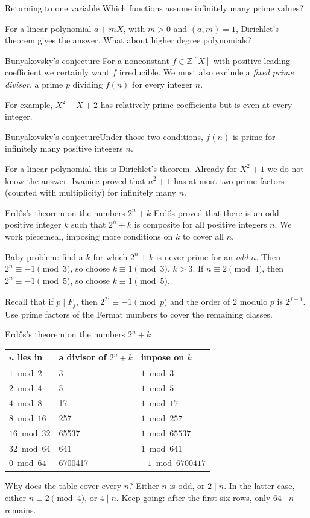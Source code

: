 \documentclass[aspectratio=169,11pt]{beamer}
\newcommand{\Z}{\mathbb Z}
\begin{document}
\begin{frame}{Returning to one variable}
Which functions assume infinitely many prime values?

For a linear polynomial $a+mX$, with $m>0$ and $(a,m)=1$, Dirichlet's theorem gives the answer. What about higher degree polynomials?
\end{frame}
\begin{frame}{Bunyakovsky's conjecture}
For a nonconstant $f\in\Z[X]$ with positive leading coefficient we certainly want $f$ irreducible. We must also exclude a \emph{fixed prime divisor}, a prime $p$ dividing $f(n)$ for every integer $n$.

For example, $X^2+X+2$ has relatively prime coefficients but is even at every integer.
\begin{block}{Bunyakovsky's conjecture}Under those two conditions, $f(n)$ is prime for infinitely many positive integers $n$.\end{block}
For a linear polynomial this is Dirichlet's theorem. Already for $X^2+1$ we do not know the answer. Iwaniec proved that $n^2+1$ has at most two prime factors (counted with multiplicity) for infinitely many $n$.
\end{frame}
\begin{frame}{Erd\H{o}s's theorem on the numbers $2^n+k$}
Erd\H{o}s proved that there is an odd positive integer $k$ such that $2^n+k$ is composite for all positive integers $n$. We work piecemeal, imposing more conditions on $k$ to cover all $n$.

Baby problem: find a $k$ for which $2^n+k$ is never prime for an \emph{odd} $n$. Then $2^n\equiv-1\pmod3$, so choose $k\equiv1\pmod3$, $k>3$. If $n\equiv2\pmod4$, then $2^n\equiv-1\pmod5$, so choose $k\equiv1\pmod5$.

Recall that if $p\mid F_j$, then $2^{2^j}\equiv-1\pmod p$ and the order of $2$ modulo $p$ is $2^{j+1}$. Use prime factors of the Fermat numbers to cover the remaining classes.
\end{frame}
\begin{frame}{Erd\H{o}s's theorem on the numbers $2^n+k$}
\small\centering
\begin{tabular}{lll}\toprule
$n$ lies in&a divisor of $2^n+k$&impose on $k$\\\midrule
$1\bmod2$&3&$1\bmod3$\\
$2\bmod4$&5&$1\bmod5$\\
$4\bmod8$&17&$1\bmod17$\\
$8\bmod16$&257&$1\bmod257$\\
$16\bmod32$&65537&$1\bmod65537$\\
$32\bmod64$&641&$1\bmod641$\\
$0\bmod64$&6700417&$-1\bmod6700417$\\\bottomrule
\end{tabular}\par\raggedright
Why does the table cover every $n$? Either $n$ is odd, or $2\mid n$. In the latter case, either $n\equiv2\pmod4$, or $4\mid n$. Keep going: after the first six rows, only $64\mid n$ remains.
\end{frame}
\end{document}

